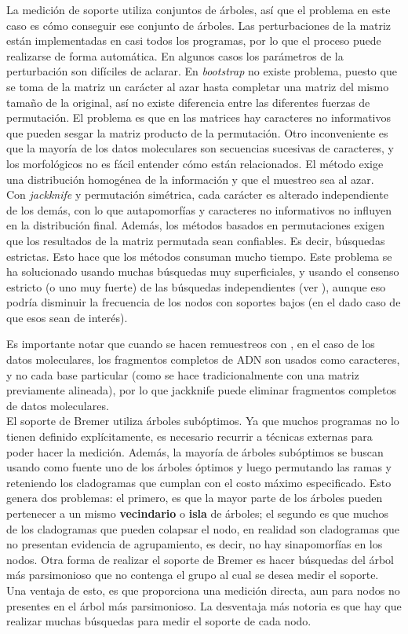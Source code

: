 La medici\'on de soporte utiliza conjuntos de \'arboles, as\'i que el problema en este caso es c\'omo conseguir ese conjunto de \'arboles. Las perturbaciones de la matriz est\'an implementadas en casi todos los programas, por lo que el proceso puede realizarse de forma autom\'atica. En algunos casos los par\'ametros de la perturbaci\'on son dif\'iciles de aclarar. En \textit{bootstrap} no existe problema, puesto que se toma de la matriz un car\'acter al azar hasta completar una matriz del mismo tama\~no de la original, as\'i no existe diferencia entre las diferentes fuerzas de permutaci\'on. El problema es que en las matrices hay caracteres no informativos que pueden sesgar la matriz producto de la permutaci\'on. Otro inconveniente es que la mayor\'ia de los datos moleculares son secuencias sucesivas de caracteres, y los morfol\'ogicos no es f\'acil entender c\'omo est\'an relacionados. El m\'etodo exige una distribuci\'on homog\'enea de la informaci\'on y que el muestreo sea al azar.\\
Con \textit{jackknife} y permutaci\'on sim\'etrica, cada car\'acter es alterado independiente de los dem\'as, con lo que autapomorf\'ias y caracteres no informativos no influyen en la distribuci\'on final. Adem\'as, los m\'etodos basados en permutaciones exigen que los resultados de la matriz permutada sean confiables. Es decir, b\'usquedas estrictas. Esto hace que los m\'etodos consuman mucho tiempo. Este problema se ha solucionado usando muchas b\'usquedas muy superficiales, y usando el consenso estricto (o uno muy fuerte) de las b\'usquedas independientes (ver \cite{Farris1996,GoloboffFarris2001}), aunque eso podr\'ia disminuir la frecuencia de los nodos con soportes bajos (en el dado caso de que esos sean de inter\'es).

Es importante notar que cuando se hacen remuestreos con , en el caso de los datos moleculares, los fragmentos completos de ADN son usados como caracteres, y no cada base particular (como se hace tradicionalmente con una matriz previamente alineada), por lo que jackknife puede eliminar fragmentos completos de datos moleculares.\\
El soporte de Bremer utiliza \'arboles sub\'optimos. Ya que muchos programas no lo tienen definido expl\'icitamente, es necesario recurrir a t\'ecnicas externas para poder hacer la medici\'on. Adem\'as, la mayor\'ia de \'arboles sub\'optimos se buscan usando como fuente uno de los \'arboles \'optimos y luego permutando las ramas y reteniendo los cladogramas que cumplan con el costo m\'aximo especificado. 
Esto genera dos problemas: el primero, es que la mayor parte de los \'arboles pueden pertenecer a un mismo \textbf{vecindario} o \textbf{isla} de \'arboles; el segundo es que muchos de los cladogramas que pueden colapsar el nodo, en realidad son cladogramas que no presentan evidencia de agrupamiento, es decir, no hay sinapomorf\'ias en los nodos. Otra forma de realizar el soporte de Bremer es hacer b\'usquedas del \'arbol m\'as parsimonioso que no contenga el grupo al cual se desea medir el soporte. Una ventaja de esto, es que proporciona una medici\'on directa, aun para nodos no presentes en el \'arbol m\'as parsimonioso. La desventaja m\'as notoria es que hay que realizar muchas b\'usquedas para medir el soporte de cada nodo.

